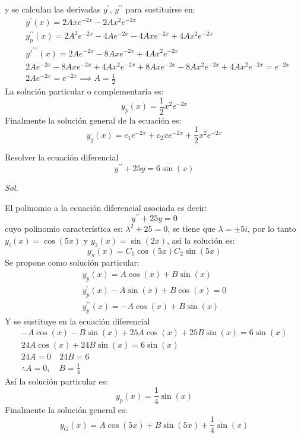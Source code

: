 y se calculan las derivadas $y^{\prime}$, $y^{\prime\prime}$ para sustituirse en:
\begin{align*}
    &y^{\prime}(x) = 2Axe^{ - 2x} - 2Ax^2e^{ - 2x}\\
    &y^{\prime\prime}_p(x) = 2A^2e^{ - 2x} - 4Ae^{ - 2x} - 4Axe^{ - 2x} + 4Ax^2e^{ -2x}\\
    &y'^{\prime\prime\prime}(x) = 2Ae^{ - 2x} - 8Axe^{ - 2x} + 4Ax^2e^{ - 2x}\\
    &2Ae^{ - 2x} - 8Axe^{ - 2x} + 4Ax^2e^{ - 2x} + 8Axe^{ - 2x} - 8Ax^2e^{ - 2x} + 4Ax^2e^{ - 2x}= e^{ -2x}\\
    &2Ae^{ - 2x} = e^{ -2x}\implies A = \frac{1}{2}
\end{align*}
La solución particular o complementaria es:
\begin{equation*}
    y_p(x) = \frac{1}{2}x^2e^{ - 2x}
\end{equation*}
Finalmente la solución general de la ecuación es:
\begin{equation*}
    y_g(x) = c_1e^{ - 2x} + c_2xe^{ - 2x} + \frac{1}{2}x^2e^{ - 2x}
\end{equation*}
\begin{example}
    Resolver la ecuación diferencial 
    \begin{equation*}
        y^{\prime\prime} + 25y= 6 \sin{(x)} 
    \end{equation*}
\end{example}

\textit{ Sol. }

El polinomio a la ecuación diferencial asociada es decir:
\begin{equation*}
    y^{\prime\prime} + 25y = 0
\end{equation*}
cuyo polinomio característica es: $\lambda^2+25=0$, se tiene que $\lambda= \pm 5i$, por lo tanto $y_i(x)= \cos{(5x)}$
y $y_2(x)=\sin{(2x)}$, así la solución es:
\begin{equation*}
    y_n(x)= C_1 \cos{(5x)} C_2\sin{(5x)}
\end{equation*}
Se propone como solución particular:
\begin{align*}
    y_p(x) = A \cos{(x)} + B \sin{(x)}\\
    y_p^{\prime}(x) - A \sin{(x)} + B \cos{(x)} = 0\\
    y^{\prime\prime}_p (x) =- A \cos{(x)} + B \sin{(x)}
\end{align*}
Y se sustituye en la ecuación diferencial
\begin{align*}
    - A \cos{(x)} - B \sin{(x)} + 25A \cos{(x)} + 25B \sin{(x)} = 6 \sin{(x)}\\
    24A \cos{(x)} + 24B \sin{(x)} = 6 \sin{(x)}\\
    24A = 0\quad 24B = 6\\
    \therefore A = 0,\quad B = \frac{1}{4}
\end{align*}
Así la solución particular es:
\begin{equation*}
    y_p(x) = \frac{1}{4} \sin{(x)}
\end{equation*}
Finalmente la solución general es:
\begin{equation*}
    y_G(x) = A \cos{(5x)} + B \sin{(5x)} + \frac{1}{4} \sin{(x)}
\end{equation*}

